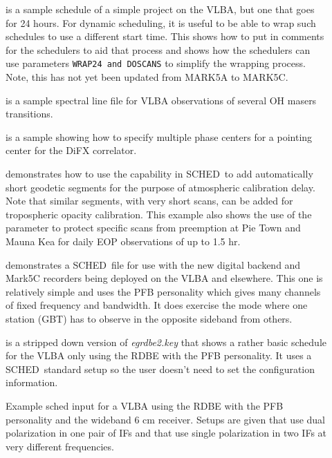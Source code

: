 \documentclass{report}
\newcommand{\schedb}{{\sc SCHED~}}
\begin{document}
\begin{description}
\item[] is a
sample schedule of a simple project on the VLBA, but one that goes
for 24 hours.  For dynamic scheduling, it is useful to be able to
wrap such schedules to use a different start time.  This shows how
to put in comments for the schedulers to aid that process and shows
how the schedulers can use parameters {\tt WRAP24 and DOSCANS} to
simplify the wrapping process.  Note, this has not yet been updated
from MARK5A to MARK5C.

\item[] is a
sample spectral line file for VLBA
observations of several OH masers transitions.

\item[] is
a sample showing how to specify multiple phase centers for a pointing
center for the DiFX correlator.

\item[]
demonstrates how to use the capability in \schedb to add automatically
short geodetic segments for the purpose of atmospheric calibration
delay.  Note that similar segments, with very short scans, can be added
for tropospheric opacity calibration.  This example also shows the use
of the  parameter to protect
specific scans from preemption at Pie Town and Mauna Kea for daily
EOP observations of up to 1.5 hr.

\item[]
demonstrates a \schedb file for use with the new digital backend and
Mark5C recorders being deployed on the VLBA and elsewhere.  This one
is relatively simple and uses the PFB personality which gives many
channels of fixed frequency and bandwidth.  It does exercise the
mode where one station (GBT) has to observe in the opposite sideband
from others.

\item[]
is a stripped down version of {\sl egrdbe2.key} that shows a rather
basic schedule for the VLBA only using the RDBE with the PFB personality.
It uses a \schedb standard setup so the user doesn't need to set
the configuration information.

\item[]
Example sched input for a VLBA using the RDBE with the PFB personality
and the wideband 6 cm receiver.  Setups are given that use dual
polarization in one pair of IFs and that use single polarization in
two IFs at very different frequencies.


\end{description}
\end{document}
